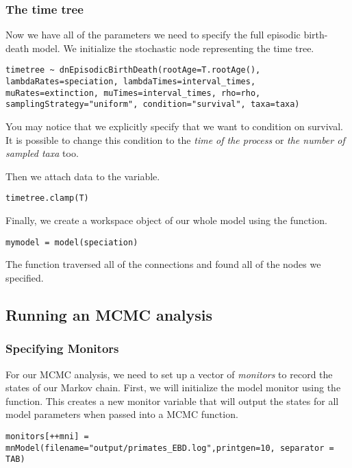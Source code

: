 \subsubsection{The time tree}

Now we have all of the parameters we need to specify the full episodic birth-death model. 
We initialize the stochastic node representing the time tree.
{\tt \begin{snugshade*}
\begin{lstlisting}
timetree ~ dnEpisodicBirthDeath(rootAge=T.rootAge(), lambdaRates=speciation, lambdaTimes=interval_times, muRates=extinction, muTimes=interval_times, rho=rho, samplingStrategy="uniform", condition="survival", taxa=taxa)
\end{lstlisting}
\end{snugshade*}}
You may notice that we explicitly specify that we want to condition on survival.
It is possible to change this condition to the \emph{time of the process} or \emph{the number of sampled taxa} too.

Then we attach data to the  variable.
{\tt \begin{snugshade*}
\begin{lstlisting}
timetree.clamp(T)
\end{lstlisting}
\end{snugshade*}}

Finally, we create a workspace object of our whole model using the  function. 
{\tt \begin{snugshade*}
\begin{lstlisting}
mymodel = model(speciation)
\end{lstlisting}
\end{snugshade*}}

The  function traversed all of the connections and found all of the nodes we specified. 


\subsection{Running an MCMC analysis}

\subsubsection{Specifying Monitors}

For our MCMC analysis, we need to set up a vector of \textit{monitors} to record the states of our Markov chain. 
First, we will initialize the model monitor using the  function. This creates a new monitor variable that will output the states for all model parameters when passed into a MCMC function. 
{\tt \begin{snugshade*}
\begin{lstlisting}
monitors[++mni] = mnModel(filename="output/primates_EBD.log",printgen=10, separator = TAB)
\end{lstlisting}
\end{snugshade*}}

